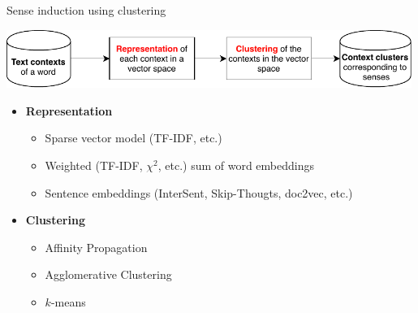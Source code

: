 %
%
%
%
%
%
%
%
%
%
%
%
%
%
%
%
%
%
%
%
%



\begin{frame}{ Sense induction using clustering }


 \begin{center}
  	\includegraphics[width=0.99\textwidth]{figures/Clustering}
  \end{center}
  
  \pause 
  \begin{itemize}
  \item \textbf{\alert{Representation}}
  \begin{itemize}
  
  \item Sparse vector model (TF-IDF, etc.)
  \item Weighted (TF-IDF, $\chi^2$, etc.) sum of word embeddings
  \item Sentence embeddings (InterSent, Skip-Thougts, doc2vec, etc.)
  \end{itemize}
  
  \pause 
  \item \textbf{\alert{Clustering}}
  
  \begin{itemize}
  \item Affinity Propagation
  \item Agglomerative Clustering
  \item $k$-means
  \end{itemize} 	
  \end{itemize}


\end{frame}



